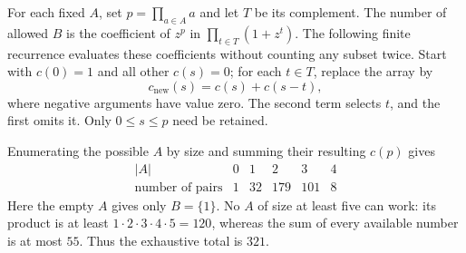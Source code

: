 For each fixed $A$, set $p=\prod_{a\in A}a$ and let $T$ be its complement. The number of allowed $B$ is the coefficient of $z^p$ in $\prod_{t\in T}(1+z^t)$. The following finite recurrence evaluates these coefficients without counting any subset twice. Start with $c(0)=1$ and all other $c(s)=0$; for each $t\in T$, replace the array by
\[
c_{\mathrm{new}}(s)=c(s)+c(s-t),
\]
where negative arguments have value zero. The second term selects $t$, and the first omits it. Only $0\le s\le p$ need be retained.

Enumerating the possible $A$ by size and summing their resulting $c(p)$ gives
\[
\begin{array}{c|rrrrr}
|A|&0&1&2&3&4\\\hline
\text{number of pairs}&1&32&179&101&8
\end{array}
\]
Here the empty $A$ gives only $B=\{1\}$. No $A$ of size at least five can work: its product is at least $1\cdot2\cdot3\cdot4\cdot5=120$, whereas the sum of every available number is at most $55$. Thus the exhaustive total is $\boxed{321}$.
